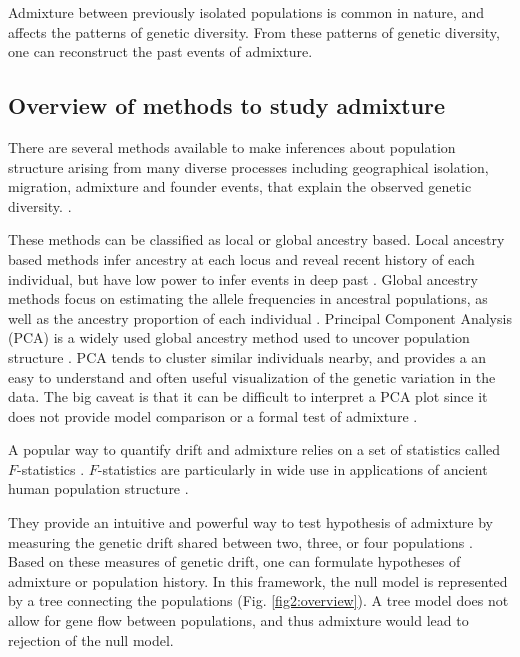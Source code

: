 \documentclass[12pt, letterpaper]{article}
\begin{document}
Admixture between previously isolated populations is common in nature, and affects the patterns of genetic diversity. From these patterns of genetic diversity, one can reconstruct the past events of admixture.  

\subsection{Overview of methods to study admixture}
There are several methods available to make inferences about population structure arising from many diverse processes including geographical isolation, migration, admixture and founder events, that explain the observed genetic diversity. \cite{schraiber_methods_2015}.


These methods can be classified as local or global ancestry based. Local ancestry based methods infer ancestry at each locus and reveal recent history of each individual, but have low power to infer events in deep past \cite{vi_genome-wide_2023, brisbin_pcadmix_2012, price_sensitive_2009, sankararaman_estimating_2008}. Global ancestry methods focus on estimating the allele frequencies in ancestral populations, as well as the ancestry proportion of each individual \cite{pritchard_inference_2000, gopalan_scaling_2016, noauthor_ancient_nodate,alexander_fast_2009, tang_estimation_2005}. Principal Component Analysis (PCA) is a widely used global ancestry method used to uncover population structure \cite{mcvean_genealogical_2009, engelhardt_analysis_2010}. PCA tends to cluster similar individuals nearby, and provides a an easy to understand and often useful visualization of the genetic variation in the data. The big caveat is that it can be difficult to interpret a PCA plot since it does not provide model comparison or a formal test of admixture \cite{novembre stevens 2008 nature, degiorgio_geographic_2013}.   

A popular way to quantify drift and admixture relies on a set of statistics called $F$-statistics \cite{patterson_ancient_2012, peter_admixture_2016}. $F$-statistics are particularly in wide use in applications of ancient human population structure \cite{orlando_ancient_2021}. 

They provide an intuitive and powerful way to test hypothesis of admixture by measuring the genetic drift shared between two, three, or four populations \cite{patterson_ancient_2012, peter_admixture_2016}. Based on these measures of genetic drift, one can formulate hypotheses of admixture or population history. In this framework, the null model is represented by a tree connecting the populations (Fig. \ref{fig2:overview}). A tree model does not allow for gene flow between populations, and thus admixture would lead to rejection of the null model. 
\end{document}
